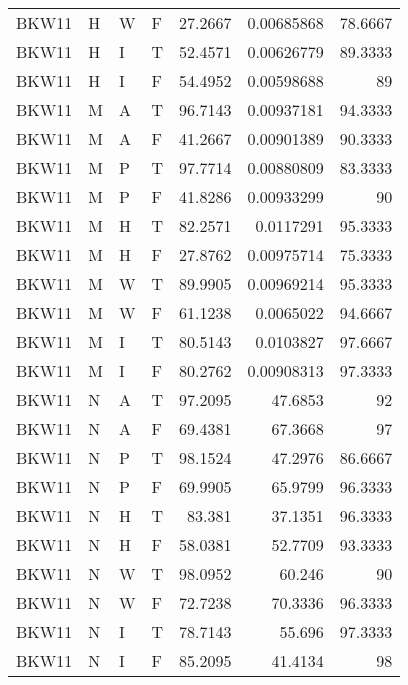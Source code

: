 \begin{table}[htb!]
{\begin{tabular}{llllrrr}
            BKW11    & H     & W     & F          & 27.2667    & 0.00685868 & 78.6667  \\
            BKW11    & H     & I     & T          & 52.4571    & 0.00626779 & 89.3333  \\
            BKW11    & H     & I     & F          & 54.4952    & 0.00598688 & 89       \\
            BKW11    & M     & A     & T          & 96.7143    & 0.00937181 & 94.3333  \\
            BKW11    & M     & A     & F          & 41.2667    & 0.00901389 & 90.3333  \\
            BKW11    & M     & P     & T          & 97.7714    & 0.00880809 & 83.3333  \\
            BKW11    & M     & P     & F          & 41.8286    & 0.00933299 & 90       \\
            BKW11    & M     & H     & T          & 82.2571    & 0.0117291  & 95.3333  \\
            BKW11    & M     & H     & F          & 27.8762    & 0.00975714 & 75.3333  \\
            BKW11    & M     & W     & T          & 89.9905    & 0.00969214 & 95.3333  \\
            BKW11    & M     & W     & F          & 61.1238    & 0.0065022  & 94.6667  \\
            BKW11    & M     & I     & T          & 80.5143    & 0.0103827  & 97.6667  \\
            BKW11    & M     & I     & F          & 80.2762    & 0.00908313 & 97.3333  \\
            BKW11    & N     & A     & T          & 97.2095    & 47.6853    & 92       \\
            BKW11    & N     & A     & F          & 69.4381    & 67.3668    & 97       \\
            BKW11    & N     & P     & T          & 98.1524    & 47.2976    & 86.6667  \\
            BKW11    & N     & P     & F          & 69.9905    & 65.9799    & 96.3333  \\
            BKW11    & N     & H     & T          & 83.381     & 37.1351    & 96.3333  \\
            BKW11    & N     & H     & F          & 58.0381    & 52.7709    & 93.3333  \\
            BKW11    & N     & W     & T          & 98.0952    & 60.246     & 90       \\
            BKW11    & N     & W     & F          & 72.7238    & 70.3336    & 96.3333  \\
            BKW11    & N     & I     & T          & 78.7143    & 55.696     & 97.3333  \\
            BKW11    & N     & I     & F          & 85.2095    & 41.4134    & 98       \\
            \hline
        \end{tabular}
    }{
    }
\end{table} 
